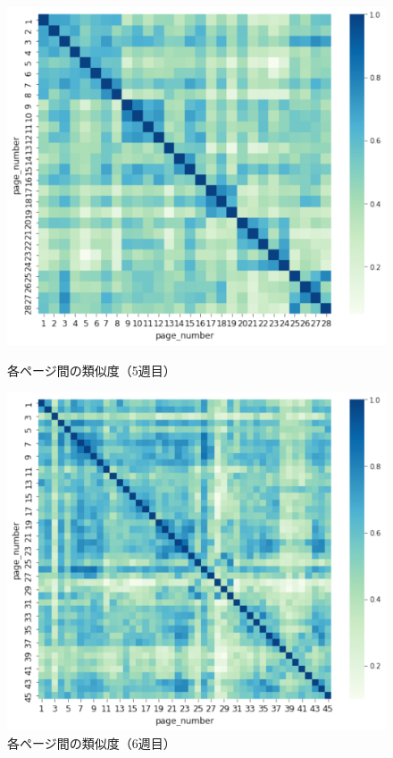 \documentclass[a4paper,12pt]{ltjsreport}
\begin{document}
\begin{figure}[tbp]
  \begin{minipage}[b]{0.5\linewidth}
    \centering
    \includegraphics[scale=0.35]{5cos.pdf}
    \caption{各ページ間の類似度（5週目）}
    \label{fig:5cos}
  \end{minipage}
  \begin{minipage}[b]{0.5\linewidth}
    \centering
    \includegraphics[scale=0.35]{6cos.pdf}
    \caption{各ページ間の類似度（6週目）}
    \label{fig:6cos}
  \end{minipage}
\end{figure}
\end{document}
